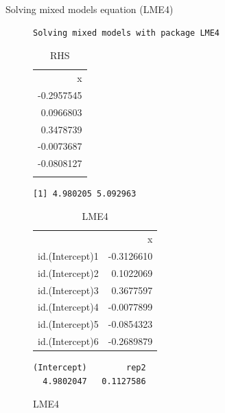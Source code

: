 \documentclass[
  ignorenonframetext,
  aspectratio=169,
]{beamer}
\begin{document}
\begin{frame}[fragile]{Solving mixed models equation (LME4)}
\label{solving-mixed-models-equation-lme4}
\begin{figure}

\begin{minipage}{0.50\linewidth}

\begin{verbatim}
Solving mixed models with package LME4
\end{verbatim}

\begingroup\fontsize{10}{12}\selectfont

\begin{longtable}[t]{r}

\caption{\label{tbl-rhs-lme4}RHS}

\tabularnewline

\\
\toprule
x\\
\midrule
-0.2957545\\
0.0966803\\
0.3478739\\
-0.0073687\\
-0.0808127\\
\addlinespace
-0.2544430\\
\bottomrule

\end{longtable}

\endgroup{}

\begin{verbatim}
[1] 4.980205 5.092963
\end{verbatim}

\end{minipage}%
%
\begin{minipage}{0.50\linewidth}

\begingroup\fontsize{10}{12}\selectfont

\begin{longtable}[t]{lr}

\caption{\label{tbl-lme4}LME4}

\tabularnewline

\\
\toprule
 & x\\
\midrule
id.(Intercept)1 & -0.3126610\\
id.(Intercept)2 & 0.1022069\\
id.(Intercept)3 & 0.3677597\\
id.(Intercept)4 & -0.0077899\\
id.(Intercept)5 & -0.0854323\\
\addlinespace
id.(Intercept)6 & -0.2689879\\
\bottomrule

\end{longtable}

\endgroup{}

\begin{verbatim}
(Intercept)        rep2 
  4.9802047   0.1127586 
\end{verbatim}

\end{minipage}%

\end{figure}%
\end{frame}
\end{document}
